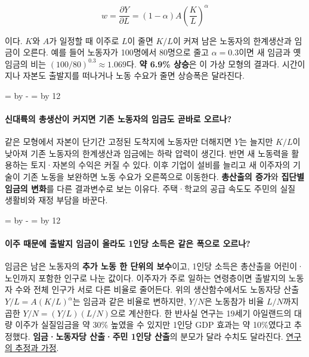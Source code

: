 \documentclass[10pt,a4paper]{article}
\newcommand{\ReserveQuestionSpace}{%
  \par\begingroup
  \dimen0=\pagegoal \advance\dimen0 by -\pagetotal
  \dimen2=\baselineskip \multiply\dimen2 by 12
  \ifdim\dimen0<\dimen2 \newpage\fi
  \endgroup}
\begin{document}
\[
w=\frac{\partial Y}{\partial L}=(1-\alpha)A\left(\frac{K}{L}\right)^\alpha
\]

이다. $K$와 $A$가 일정할 때 이주로 $L$이 줄면 $K/L$이 커져 남은 노동자의 한계생산과 임금이 오른다. 예를 들어 노동자가 100명에서 80명으로 줄고 $\alpha=0.3$이면 새 임금과 옛 임금의 비는 $(100/80)^{0.3}\approx1.069$다. \textbf{약 6.9\% 상승}은 이 가상 모형의 결과다. 시간이 지나 자본도 출발지를 떠나거나 노동 수요가 줄면 상승폭은 달라진다.\par

\ReserveQuestionSpace
\paragraph{신대륙의 총생산이 커지면 기존 노동자의 임금도 곧바로 오르나?}
같은 모형에서 자본이 단기간 고정된 도착지에 노동자만 더해지면 $Y$는 늘지만 $K/L$이 낮아져 기존 노동자의 한계생산과 임금에는 하락 압력이 생긴다. 반면 새 노동력을 활용하는 토지·자본의 수익은 커질 수 있다. 이후 기업이 설비를 늘리고 새 이주자의 기술이 기존 노동을 보완하면 노동 수요가 오른쪽으로 이동한다. \textbf{총산출의 증가}와 \textbf{집단별 임금의 변화}를 다른 결과변수로 보는 이유다. 주택·학교의 공급 속도도 주민의 실질 생활비와 재정 부담을 바꾼다.\par

\ReserveQuestionSpace
\paragraph{이주 때문에 출발지 임금이 올라도 1인당 소득은 같은 폭으로 오르나?}
임금은 남은 노동자의 \textbf{추가 노동 한 단위의 보수}이고, 1인당 소득은 총산출을 어린이·노인까지 포함한 인구로 나눈 값이다. 이주자가 주로 일하는 연령층이면 출발지의 노동자 수와 전체 인구가 서로 다른 비율로 줄어든다. 위의 생산함수에서도 노동자당 산출 $Y/L=A(K/L)^\alpha$는 임금과 같은 비율로 변하지만, $Y/N$은 노동참가 비율 $L/N$까지 곱한 $Y/N=(Y/L)(L/N)$으로 계산한다. 한 반사실 연구는 19세기 아일랜드의 대량 이주가 실질임금을 약 30\% 높였을 수 있지만 1인당 GDP 효과는 약 10\%였다고 추정했다. \textbf{임금·노동자당 산출·주민 1인당 산출}의 분모가 달라 수치도 달라진다. \href{https://www.nber.org/papers/w4711.pdf}{연구의 추정과 가정}.\par
\end{document}
